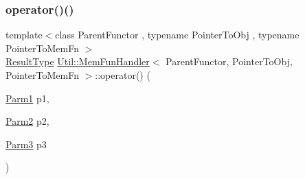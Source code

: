 \subsubsection{\texorpdfstring{operator()()}{operator()()}\hspace{0.1cm}{\footnotesize\ttfamily [12/18]}}
{\footnotesize\ttfamily template$<$class Parent\+Functor , typename Pointer\+To\+Obj , typename Pointer\+To\+Mem\+Fn $>$ \\
\mbox{\hyperlink{classUtil_1_1MemFunHandler_a093690dcced95ad48c5429e50006c83e}{Result\+Type}} \mbox{\hyperlink{classUtil_1_1MemFunHandler}{Util\+::\+Mem\+Fun\+Handler}}$<$ Parent\+Functor, Pointer\+To\+Obj, Pointer\+To\+Mem\+Fn $>$\+::operator() (\begin{DoxyParamCaption}\item[{\mbox{\hyperlink{classUtil_1_1MemFunHandler_a43182733677fc623d89e5613ecf15761}{Parm1}}}]{p1,  }\item[{\mbox{\hyperlink{classUtil_1_1MemFunHandler_a9d454c62047cb4bff3173b5bda9a38c8}{Parm2}}}]{p2,  }\item[{\mbox{\hyperlink{classUtil_1_1MemFunHandler_a6cbef94d16f4d6b29d6a8a90afbeff4f}{Parm3}}}]{p3 }\end{DoxyParamCaption})\hspace{0.3cm}{\ttfamily [inline]}}

\mbox{\label{classUtil_1_1MemFunHandler_a3b8e6d9b4cb79aa0c8c4875422b10eba}} 
